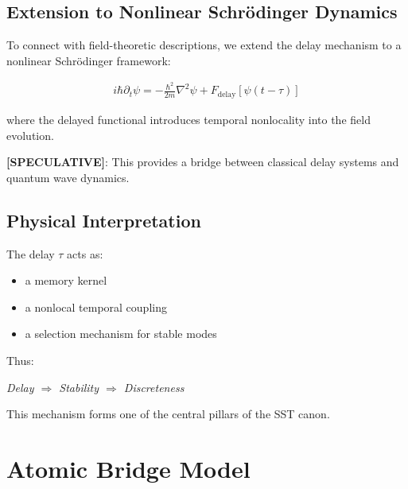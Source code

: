 \documentclass[11pt]{article}
\theoremstyle{definition}
\theoremstyle{plain}
\theoremstyle{remark}
\begin{document}
    \subsection{Extension to Nonlinear Schrödinger Dynamics}
        
        To connect with field-theoretic descriptions, we extend the delay mechanism to a nonlinear Schrödinger framework:
        
        \begin{align}
            i \hbar \partial_t \psi = -\frac{\hbar^2}{2m} \nabla^2 \psi + F_{\text{delay}}[\psi(t - \tau)]
        \end{align}
        
        where the delayed functional introduces temporal nonlocality into the field evolution.
        
        \textbf{[SPECULATIVE]}: This provides a bridge between classical delay systems and quantum wave dynamics.
    
    \subsection{Physical Interpretation}
        
        The delay $\tau$ acts as:
        
        \begin{itemize}
            \item a memory kernel
            \item a nonlocal temporal coupling
            \item a selection mechanism for stable modes
        \end{itemize}
        
        Thus:
        
        \begin{center}
            \textit{Delay $\Rightarrow$ Stability $\Rightarrow$ Discreteness}
        \end{center}
        
        This mechanism forms one of the central pillars of the SST canon.

        
\section{Atomic Bridge Model}
    \label{sec:atomic}
\end{document}

